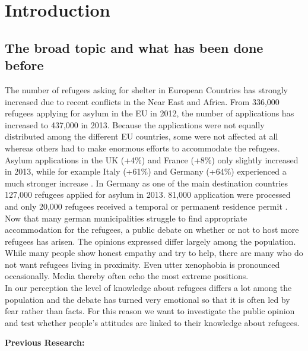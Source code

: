 \section{Introduction}

\subsection{The broad topic and what has been done before}

The number of refugees asking for shelter in European Countries has strongly increased due to recent conflicts in the Near East and Africa.
From 336,000 refugees applying for asylum in the EU in 2012, the number of applications has increased to 437,000 in 2013. Because the applications were not equally distributed among the different EU countries, some were not affected at all whereas others had to make enormous efforts to accommodate the refugees. Asylum applications in the UK (+4\%) and France (+8\%) only slightly increased in 2013, while for example Italy (+61\%) and Germany (+64\%) experienced a much stronger increase \citep{BAMF2014}. In Germany as one of the main destination countries 127,000 refugees applied for asylum in 2013. 81,000 application were processed and only 20,000 refugees received a temporal or permanent residence permit \citep{BAMF2013}.
Now that many german municipalities struggle to find appropriate accommodation for the refugees, a public debate on whether or not to host more refugees has arisen. The opinions expressed differ largely among the population. While many people show honest empathy and try to help, there are many who do not want refugees living in proximity. Even utter xenophobia is pronounced occasionally. Media thereby often echo the most extreme positions.\\
In our perception the level of knowledge about refugees differs a lot among the population and the debate has turned very emotional so that it is often led by fear rather than facts. For this reason we want to investigate the public opinion and test whether people's attitudes are linked to their knowledge about refugees.

\textbf{Previous Research:}

